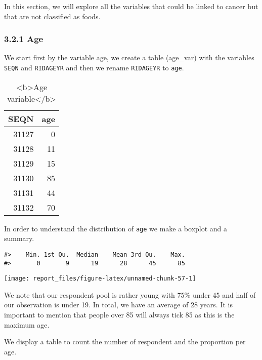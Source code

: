 \documentclass[
]{article}
\begin{document}
In this section, we will explore all the variables that could be linked
to cancer but that are not classified as foods.

\hypertarget{age}{%
\subsubsection{3.2.1 Age}\label{age}}

We start first by the variable age, we create a table (age\_var) with
the variables \texttt{SEQN} and \texttt{RIDAGEYR} and then we rename
\texttt{RIDAGEYR} to \texttt{age}.

\begin{table}

\caption{\label{tab:unnamed-chunk-56}<b>Age variable</b>}
\centering
\begin{tabular}[t]{r|r}
\hline
SEQN & age\\
\hline
31127 & 0\\
\hline
31128 & 11\\
\hline
31129 & 15\\
\hline
31130 & 85\\
\hline
31131 & 44\\
\hline
31132 & 70\\
\hline
\end{tabular}
\end{table}

In order to understand the distribution of \texttt{age} we make a
boxplot and a summary.

\begin{verbatim}
#>    Min. 1st Qu.  Median    Mean 3rd Qu.    Max. 
#>       0       9      19      28      45      85
\end{verbatim}

\begin{center}\texttt{[image: report\_files/figure-latex/unnamed-chunk-57-1]} \end{center}

We note that our respondent pool is rather young with 75\% under 45 and
half of our observation is under 19. In total, we have an average of 28
years. It is important to mention that people over 85 will always tick
85 as this is the maximum age.

We display a table to count the number of respondent and the proportion
per age.
\end{document}
